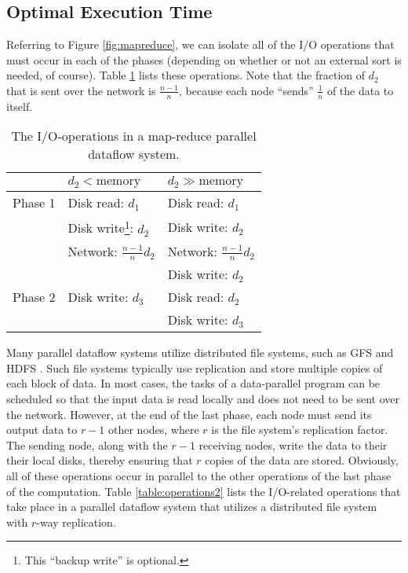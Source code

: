 \documentclass{acm_proc_article-sp}
\begin{document}
\subsection{Optimal Execution Time}

Referring to Figure \ref{fig:mapreduce}, we can isolate all of the I/O
operations that must occur in each of the phases (depending on whether or not
an external sort is needed, of course). Table \ref{table:operations1} lists
these operations. Note that the fraction of $d_2$ that is sent
over the network is $\frac{n-1}{n}$, because each node ``sends'' $\frac{1}{n}$ of the data to itself.

\begin{table}
\centering
\begin{minipage}{0.5\textwidth}
\centering
\renewcommand{\arraystretch}{1.2}
\begin{tabular}{|l|l|l|}
\hline
        & $d_2 < \text{memory}$          & $d_2 \gg \text{memory}$ \\ \hline
Phase 1 & Disk read:  $d_1$              & Disk read:  $d_1$ \\ 
        & Disk write\footnote{This ``backup write'' is optional.}: $d_2$ & Disk write: $d_2$ \\
        & Network: $\frac{n-1}{n} d_2$   & Network: $\frac{n-1}{n} d_2$ \\
        &                                & Disk write: $d_2$ \\ \hline
Phase 2 & Disk write: $d_3$              & Disk read: $d_2$ \\
        &                                & Disk write: $d_3$ \\ \hline
\end{tabular}
\caption{The I/O-operations in a map-reduce parallel dataflow system.}
\label{table:operations1}
\end{minipage}
\end{table}

Many parallel dataflow systems utilize distributed file systems, such as GFS \cite{gfs} and HDFS \cite{hdfs}. Such file systems typically use replication and store multiple copies of each block of data. In most cases, the tasks of a data-parallel program can be scheduled so that the input data is read locally and does not need to be sent over the network. However, at the end of the last phase, each node must send its output data to $r - 1$ other nodes, where $r$ is the file system's replication factor. The sending node, along with the $r - 1$ receiving nodes, write the data to their their local disks, thereby ensuring that $r$ copies of the data are stored. Obviously, all of these operations occur in parallel to the other operations of the last phase of the computation. Table \ref{table:operations2} lists the I/O-related operations that take place in a parallel dataflow system that utilizes a distributed file system with $r$-way replication.
\end{document}
